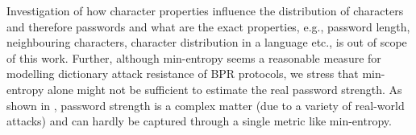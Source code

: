 
\begin{remark}
Investigation of how character properties influence the distribution \DD of characters and therefore passwords and what are the exact properties, e.g., password length, neighbouring characters, character distribution in a language etc., is out of scope of this work.
Further, although min-entropy seems a reasonable measure for modelling dictionary attack resistance of BPR protocols,
we stress that min-entropy alone might not be sufficient to estimate the real password strength. 
As shown in \cite{MazurekKVBCCKSU13}, password strength is a complex matter (due to a variety of real-world attacks) and can hardly be captured through a single metric like min-entropy.
\end{remark}

